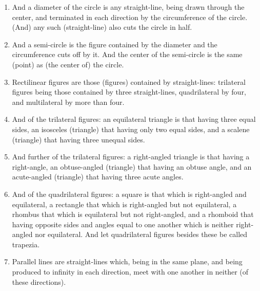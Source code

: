 \begin{enumerate}
    \item \label{def:17} And a diameter of the circle is any straight-line, being drawn through the center, and terminated in each direction by the circumference of the circle. (And) any such (straight-line) also cuts the circle in half.
    \item \label{def:18} And a semi-circle is the figure contained by the diameter and the circumference cuts off by it. And the center of the semi-circle is the same (point) as (the center of) the circle.
    \item \label{def:19} Rectilinear figures are those (figures) contained by straight-lines: trilateral figures being those contained by three straight-lines, quadrilateral by four, and multilateral by more than four.
    \item \label{def:20} And of the trilateral figures: an equilateral triangle is that having three equal sides, an isosceles (triangle) that having only two equal sides, and a scalene (triangle) that having three unequal sides.
    \item \label{def:21} And further of the trilateral figures: a right-angled triangle is that having a right-angle, an obtuse-angled (triangle) that having an obtuse angle, and an acute-angled (triangle) that having three acute angles.
    \item \label{def:22} And of the quadrilateral figures: a square is that which is right-angled and equilateral, a rectangle that which is right-angled but not equilateral, a rhombus that which is equilateral but not right-angled, and a rhomboid that having opposite sides and angles equal to one another which is neither right-angled nor equilateral. And let quadrilateral figures besides these be called trapezia.
    \item \label{def:23} Parallel lines are straight-lines which, being in the same plane, and being produced to infinity in each direction, meet with one another in neither (of these directions).
\end{enumerate}